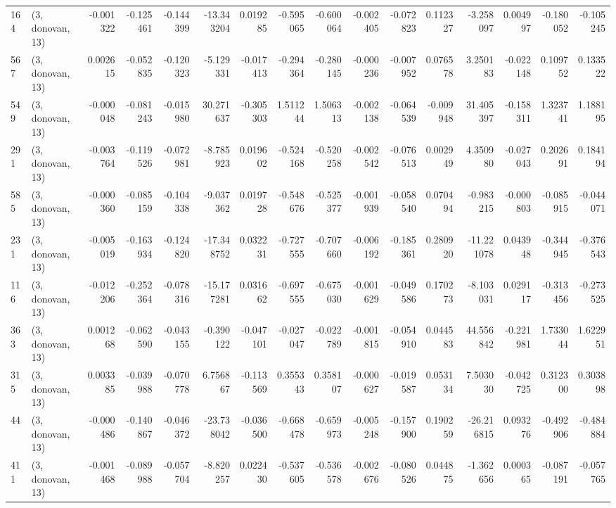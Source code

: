 \begin{tabular}{llrrrrrrrrrrrrrr}
164 &  (3, donovan, 13) &  -0.001322 & -0.125461 & -0.144399 &  -13.343204 &  0.019285 &  -0.595065 &  -0.600064 & -0.002405 & -0.072823 &  0.112327 &   -3.258097 &  0.004997 &  -0.180052 &  -0.105245 \\
567 &  (3, donovan, 13) &   0.002615 & -0.052835 & -0.120323 &   -5.129331 & -0.017413 &  -0.294364 &  -0.280145 & -0.000236 & -0.007952 &  0.076578 &    3.250183 & -0.022148 &   0.109752 &   0.133522 \\
549 &  (3, donovan, 13) &  -0.000048 & -0.081243 & -0.015980 &   30.271637 & -0.305303 &   1.511244 &   1.506313 & -0.002138 & -0.064539 & -0.009948 &   31.405397 & -0.158311 &   1.323741 &   1.188195 \\
291 &  (3, donovan, 13) &  -0.003764 & -0.119526 & -0.072981 &   -8.785923 &  0.019602 &  -0.524168 &  -0.520258 & -0.002542 & -0.076513 &  0.002949 &    4.350980 & -0.027043 &   0.202691 &   0.184194 \\
585 &  (3, donovan, 13) &  -0.000360 & -0.085159 & -0.104338 &   -9.037362 &  0.019728 &  -0.548676 &  -0.525377 & -0.001939 & -0.058540 &  0.070494 &   -0.983215 & -0.000803 &  -0.085915 &  -0.044071 \\
231 &  (3, donovan, 13) &  -0.005019 & -0.163934 & -0.124820 &  -17.348752 &  0.032231 &  -0.727555 &  -0.707660 & -0.006192 & -0.185361 &  0.280920 &  -11.221078 &  0.043948 &  -0.344945 &  -0.376543 \\
116 &  (3, donovan, 13) &  -0.012206 & -0.252364 & -0.078316 &  -15.177281 &  0.031662 &  -0.697555 &  -0.675030 & -0.001629 & -0.049586 &  0.170273 &   -8.103031 &  0.029117 &  -0.313456 &  -0.273525 \\
363 &  (3, donovan, 13) &   0.001268 & -0.062590 & -0.043155 &   -0.390122 & -0.047101 &  -0.027047 &  -0.022789 & -0.001815 & -0.054910 &  0.044583 &   44.556842 & -0.221981 &   1.733044 &   1.622951 \\
315 &  (3, donovan, 13) &   0.003385 & -0.039988 & -0.070778 &    6.756867 & -0.113569 &   0.355343 &   0.358107 & -0.000627 & -0.019587 &  0.053134 &    7.503030 & -0.042725 &   0.312300 &   0.303898 \\
44  &  (3, donovan, 13) &  -0.000486 & -0.140867 & -0.046372 &  -23.738042 & -0.036500 &  -0.668478 &  -0.659973 & -0.005248 & -0.157900 &  0.190259 &  -26.216815 &  0.093276 &  -0.492906 &  -0.484884 \\
411 &  (3, donovan, 13) &  -0.001468 & -0.089988 & -0.057704 &   -8.820257 &  0.022430 &  -0.537605 &  -0.536578 & -0.002676 & -0.080526 &  0.044875 &   -1.362656 &  0.000365 &  -0.087191 &  -0.057765 \\

\end{tabular}
